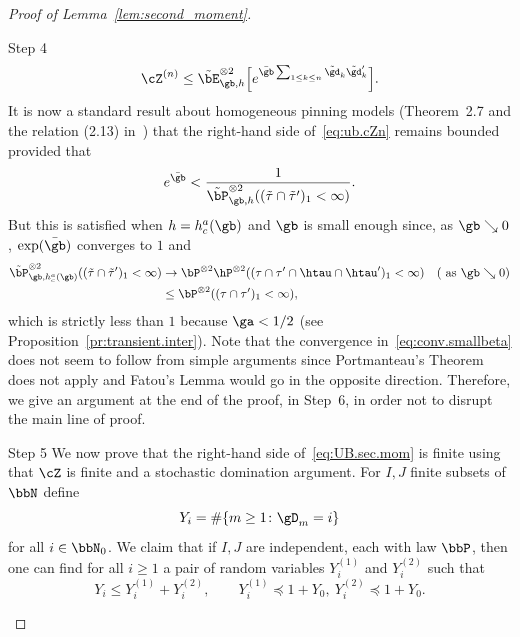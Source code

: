 \begin{proof}[Proof of Lemma~\ref{lem:second_moment}]
\begin{step}{Step 4}
\begin{equation}\label{eq:ub.cZn}
\cZ^{(n)} \leq \tilde \bE_{\gb,h}^{\otimes 2} \Big[e^{\bar\gb \sum_{1\leq k\leq n} \tilde \gd_k \tilde \gd_k' } \Big].
\end{equation}
It is now a standard result about homogeneous pinning models (Theorem~2.7 and the relation (2.13) in~\cite{Gi2011}) that the right-hand side of~\eqref{eq:ub.cZn} remains bounded provided that
\begin{equation}
e^{\bar\gb} < \frac{1}{\tilde \bP^{\otimes 2}_{\gb,h}((\tilde \tau \cap \tilde \tau')_1 < \infty)}.
\end{equation}
But this is satisfied when $h = h_c^a(\gb)$ and $\gb$ is small enough since, as $\gb \searrow 0$, $\exp(\bar\gb)$ converges to $1$ and
\begin{equation}\label{eq:conv.smallbeta}
\begin{aligned}
\tilde \bP^{\otimes 2}_{\gb,h_c^a(\gb)}((\tilde \tau \cap \tilde \tau')_1 < \infty) &\to \bP^{\otimes 2} \hP^{\otimes 2}((\tau \cap \tau' \cap \htau \cap \htau')_1 < \infty) \quad (\text{ as } \gb \searrow 0)\\
&\leq \bP^{\otimes 2}((\tau \cap \tau')_1 < \infty),
\end{aligned}
\end{equation}
which is strictly less than $1$ because $\ga < 1/2$ (see Proposition~\ref{pr:transient.inter}). Note that the convergence in~\eqref{eq:conv.smallbeta} does not seem to follow from simple arguments since Portmanteau's Theorem does not apply and Fatou's Lemma would go in the opposite direction. Therefore, we give an argument at the end of the proof, in Step~6, in order not to disrupt the main line of proof.
\end{step}

\begin{step}{Step 5}
We now prove that the right-hand side of~\eqref{eq:UB.sec.mom} is finite using that $\cZ$ is finite and a stochastic domination argument. For $I, J$ finite subsets of $\bbN$ define
\[
Y_i=\#\{m\geq1 \colon \gD_m = i\}
\]
for all $i\in\bbN_0$. We claim that if $I, J$ are independent, each with law $\bbP$, then one can find for all $i \geq 1$ a pair of random variables $Y_i^{(1)}$ and $Y_i^{(2)}$ such that
\begin{equation}\label{eq:stoch.dom}
Y_i \le Y_i^{(1)}+Y_i^{(2)}, \qquad Y_i^{(1)} \preceq 1+ Y_0,\ Y_i^{(2)} \preceq 1+ Y_0.
\end{equation}


\end{step}
\end{proof}
